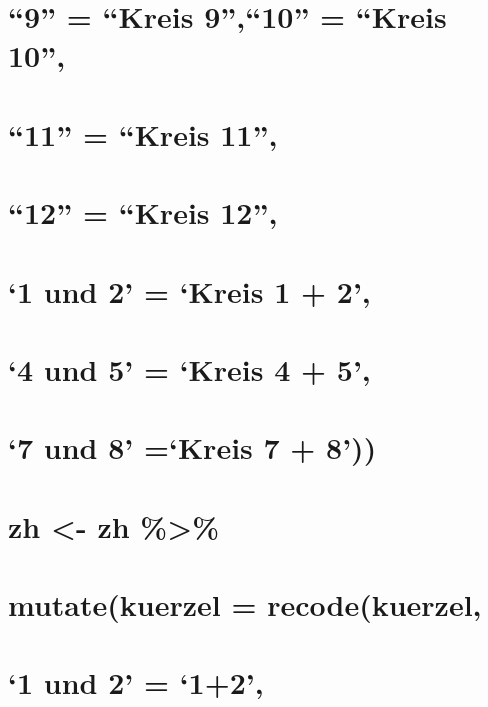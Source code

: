 \documentclass[
]{article}
\begin{document}
\hypertarget{kreis-910-kreis-10}{%
\section{``9'' = ``Kreis 9'',``10'' = ``Kreis
10'',}\label{kreis-910-kreis-10}}

\hypertarget{kreis-11}{%
\section{``11'' = ``Kreis 11'',}\label{kreis-11}}

\hypertarget{kreis-12}{%
\section{``12'' = ``Kreis 12'',}\label{kreis-12}}

\hypertarget{und-2-kreis-1-2}{%
\section{`1 und 2' = `Kreis 1 + 2',}\label{und-2-kreis-1-2}}

\hypertarget{und-5-kreis-4-5}{%
\section{`4 und 5' = `Kreis 4 + 5',}\label{und-5-kreis-4-5}}

\hypertarget{und-8-kreis-7-8}{%
\section{`7 und 8' =`Kreis 7 + 8'))}\label{und-8-kreis-7-8}}

\hypertarget{zh---zh-1}{%
\section{zh \textless- zh \%\textgreater\%}\label{zh---zh-1}}

\hypertarget{mutatekuerzel-recodekuerzel}{%
\section{mutate(kuerzel =
recode(kuerzel,}\label{mutatekuerzel-recodekuerzel}}

\hypertarget{und-2-12}{%
\section{`1 und 2' = `1+2',}\label{und-2-12}}
\end{document}
